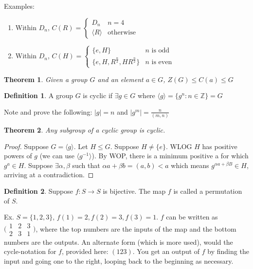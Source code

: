 \documentclass{article}
\theoremstyle{definition}
\newtheorem{definition}{Definition}
\theoremstyle{plain}
\newtheorem{theorem}{Theorem}
\theoremstyle{corollary}
\theoremstyle{lemma}
\begin{document}
Examples:
\begin{enumerate}
    \item Within $D_n$, $C(R)=\begin{cases}
        D_n & n=4\\
        \langle R\rangle & \text{otherwise}
    \end{cases}$
    \item Within $D_n$, $C(H)=\begin{cases}
        \{e,H\} & n\text{ is odd}\\
        \{e,H,R^{\frac n 2}, HR^{\frac n 2}\} & n\text{ is even}
    \end{cases}$
\end{enumerate}

\begin{theorem}
Given a group $G$ and an element $a\in G$, $Z(G)\leq C(a)\leq G$
\end{theorem}

\begin{definition}
A group $G$ is cyclic if $\exists g\in G$ where $\langle g\rangle=\{g^n:n\in\mathbb{Z}\}=G$
\end{definition}

Note and prove the following: $|g|=n$ and $|g^m|=\frac{n}{(m,n)}$

\begin{theorem}
Any subgroup of a cyclic group is cyclic.
\end{theorem}
\begin{proof}
Suppose $G=\langle g\rangle$.
Let $H\leq G$. Suppose $H\neq \{e\}$. WLOG $H$ has positive powers of $g$ (we can use $\langle g^{-1}\rangle$). By WOP, there is a minimum positive a for which $g^a\in H$. Suppose $\exists \alpha,\beta$ such that $\alpha a+\beta b=(a,b)<a$ which means $g^{\alpha a+\beta B}\in H$, arriving at a contradiction.
\end{proof}

\begin{definition}
Suppose $f:S\rightarrow S$ is bijective. The map $f$ is called a permutation of $S$.
\end{definition}

Ex. $S=\{1,2,3\}$, $f(1)=2,f(2)=3,f(3)=1$. $f$ can be written as $\bigl(\begin{smallmatrix}
  1 & 2 & 3 \\
  2 & 3 & 1
\end{smallmatrix}\bigr)$, where the top numbers are the inputs of the map and the bottom numbers are the outputs. An alternate form (which is more used), would the cycle-notation for $f$, provided here: $(1 2 3)$. You get an output of $f$ by finding the input and going one to the right, looping back to the beginning as necessary.
\end{document}

